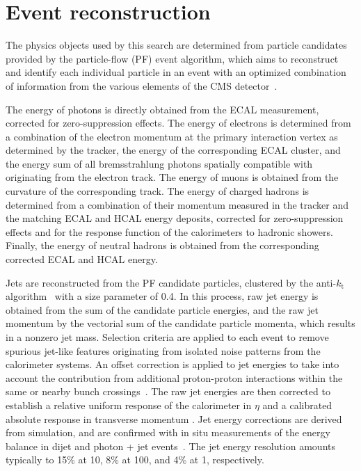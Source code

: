 \section{Event reconstruction}
\label{sec:reconstruction}

The physics objects used by this search are determined from particle
candidates provided by the particle-flow (PF) event algorithm, which
aims to reconstruct and identify each individual particle in an event
with an optimized combination of information from the various elements
of the CMS detector~\cite{CMS-PAS-PFT-09-001, CMS-PAS-PFT-10-001}.

The energy of photons is directly obtained from the ECAL measurement,
corrected for zero-suppression effects. The energy of electrons is
determined from a combination of the electron momentum at the primary
interaction vertex as determined by the tracker, the energy of the
corresponding ECAL cluster, and the energy sum of all bremsstrahlung
photons spatially compatible with originating from the electron
track. The energy of muons is obtained from the curvature of the
corresponding track. The energy of charged hadrons is determined from
a combination of their momentum measured in the tracker and the
matching ECAL and HCAL energy deposits, corrected for zero-suppression
effects and for the response function of the calorimeters to hadronic
showers. Finally, the energy of neutral hadrons is obtained from the
corresponding corrected ECAL and HCAL energy.

Jets are reconstructed from the PF candidate particles, clustered by
the anti-$k_\mathrm{t}$ algorithm~\cite{Cacciari:2008gp,
  Cacciari:2011ma} with a size parameter of 0.4. In this process, raw
jet energy is obtained from the sum of the candidate particle
energies, and the raw jet momentum by the vectorial sum of the
candidate particle momenta, which results in a nonzero jet
mass. Selection criteria are applied to each event to remove spurious
jet-like features originating from isolated noise patterns from the
calorimeter systems. An offset correction is applied to jet energies
to take into account the contribution from additional proton-proton
interactions within the same or nearby bunch crossings~\cite{pileup}.
The raw jet energies are then corrected to establish a relative
uniform response of the calorimeter in $\eta$ and a calibrated
absolute response in transverse momentum \pt. Jet energy corrections
are derived from simulation, and are confirmed with in situ
measurements of the energy balance in dijet and photon + jet
events~\cite{Chatrchyan:2011ds}. The jet energy resolution amounts
typically to 15\% at 10\GeV, 8\% at 100\GeV, and 4\% at 1\TeV,
respectively. 

